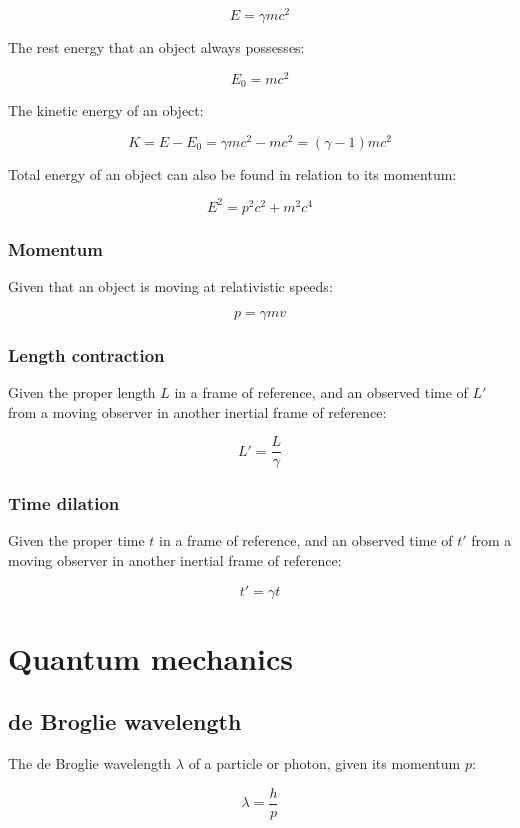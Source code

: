 \documentclass[12pt]{article}
\begin{document}
\[
\boxed{
E = \gamma mc^2
}
\]

The rest energy that an object always possesses:

\[
\boxed{
E_0 = mc^2
}
\]

The kinetic energy of an object:

\[
\boxed{
K = E - E_0 = \gamma mc^2 - mc^2 = (\gamma - 1)mc^2
}
\]

Total energy of an object can also be found in relation to its momentum:

\[
\boxed{
E^2 = p^2 c^2 + m^2 c^4
}
\]

\subsubsection{Momentum}

Given that an object is moving at relativistic speeds:

\[
\boxed{
p = \gamma m v
}
\]

\subsubsection{Length contraction}

Given the proper length $L$ in a frame of reference, and an observed time of $L'$ from a moving observer in another inertial frame of reference:

\[
\boxed{
L' = \frac{L}{\gamma}
}
\]

\subsubsection{Time dilation}

Given the proper time $t$ in a frame of reference, and an observed time of $t'$ from a moving observer in another inertial frame of reference:

\[
\boxed{
t' = \gamma t
}
\]

\section{Quantum mechanics}

\subsection{de Broglie wavelength}

The de Broglie wavelength $\lambda$ of a particle or photon, given its momentum $p$:

\[
\boxed{
\lambda = \frac{h}{p}
}
\]
\end{document}
